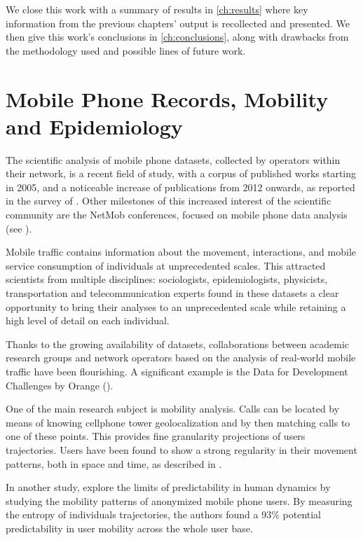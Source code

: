 We close this work with a summary of results in \cref{ch:results} where key information from the previous chapters' output is recollected and presented.
We then give this work's conclusions in \cref{ch:conclusions}, along with drawbacks from the methodology used and possible lines of future work.


\section{Mobile Phone Records, Mobility and Epidemiology}

The scientific analysis of mobile phone datasets, collected by operators within their network, is a recent field of study, with a corpus of published works starting in 2005, and a noticeable increase of publications from 2012 onwards, as reported in the survey of \cite{naboulsi2015mobile}. 
Other milestones of this increased interest of the scientific community are the NetMob conferences, focused on mobile phone data analysis (see \cite{netmob}).

Mobile traffic contains information about the movement, interactions, and mobile service consumption of individuals at unprecedented scales.
This attracted scientists from multiple disciplines:
sociologists, epidemiologists, physicists, transportation and telecommunication experts found in these datasets a clear opportunity to bring their analyses to an unprecedented scale while retaining a high level of detail on each individual.

Thanks to the growing availability of datasets, collaborations between academic research groups and network operators based on the analysis of real-world mobile traffic have been flourishing. 
A significant example is the Data for Development Challenges by Orange (\cite{d4d}).

One of the main research subject is mobility analysis.
Calls can be located by means of knowing cellphone tower geolocalization and by then matching calls to one of these points.
This provides fine granularity projections of users trajectories.
Users have been found to show a strong regularity in their movement patterns,
both in space and time, as described in \cite{gonzalez2008understanding}.

In another study, \cite{song2010limits} explore the limits of predictability in human dynamics by studying the mobility patterns of anonymized mobile phone users.
By measuring the entropy of individuals trajectories, the authors found a 93\% potential predictability in user mobility across the whole user base.

